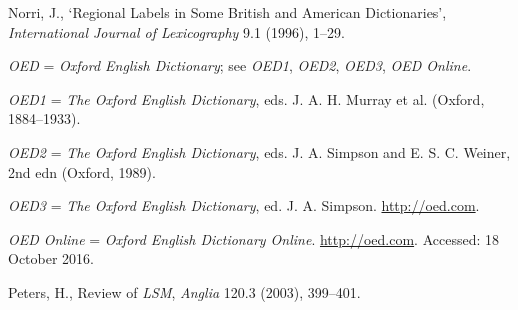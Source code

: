\begin{list}{}
\item %
Norri, J., `Regional Labels in Some British and American Dictionaries', \textit{International Journal of Lexicography} 9.1 (1996), 1–29.




\item %
\textit{OED} = \textit{Oxford English Dictionary}; see \textit{OED1}, \textit{OED2}, \textit{OED3}, \textit{OED Online}.

\item 
\textit{OED1} = 
\textit{The Oxford English Dictionary}, eds. J. A. H. Murray et al. (Oxford, 1884–1933).


\item 
\textit{OED2} = 
\textit{The Oxford English Dictionary}, eds. J. A. Simpson and E. S. C. Weiner, 2nd edn (Oxford, 1989). 


\item 
\textit{OED3} = 
\textit{The Oxford English Dictionary}, ed. J. A. Simpson. \url{http://oed.com}.

\item %
\textit{OED Online}	= \textit{Oxford English Dictionary Online}. \url{http://oed.com}. Accessed: 18 October 2016.

\item %
Peters, H., Review of \textit{LSM}, \textit{Anglia} 120.3 (2003), 399–401.


\end{list}
